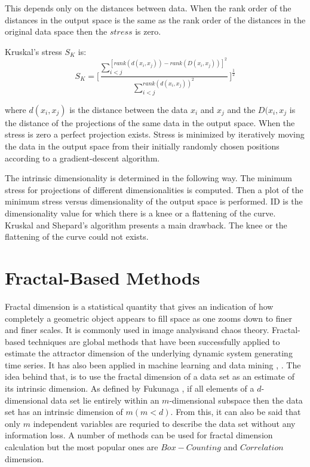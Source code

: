 \documentclass[journal]{IEEEtran}
\begin{document}
This depends only on the distances between data. When the rank order of the distances in the 
output space is the same as the rank order of the distances in the original data space then the \(stress\) is zero.

Kruskal’s stress \(S_K\) is:
\begin{equation}
  \label{eq_stress_sk}
  S_K =  \Big[\frac{\sum_{i<j}^{[rank(d(x_i, x_j)) - rank(D(x_i, x_j))]^2}}{\sum_{i<j}^{rank(d(x_i, x_j))^2}}\Big]^{\frac{1}{2}}
\end{equation}
  
where \(d(x_i, x_j)\) is the distance between the data \(x_i\) and \(x_j\) and the \(D(x_i, x_j\) is 
the distance of the projections of the same data in the output space. When the stress is zero a perfect projection exists. 
Stress is minimized by iteratively moving the data in the output space from their initially randomly chosen positions 
according to a gradient-descent algorithm.

The intrinsic dimensionality is determined in the following way. The minimum stress for projections of different dimensionalities is computed. 
Then a plot of the minimum stress versus dimensionality of the output space is performed. 
ID is the dimensionality value for which there is a knee or a flattening of the curve. 
Kruskal and Shepard’s algorithm presents a main drawback. The knee or the flattening of the curve could not exists.


\section{Fractal-Based Methods}
Fractal dimension is a statistical quantity that gives an indication of how completely a 
geometric object appears to fill space as one zooms down to finer and finer scales.
It is commonly used in image analysisand chaos theory.
Fractal-based techniques are global methods that have been successfully applied to estimate 
the attractor dimension of the underlying dynamic system generating time series.
It has also been applied in machine learning and data mining \cite{Bhavani08}, \cite{CamastraOct2002}. The idea behind that, is to use the fractal dimension of a data set 
as an estimate of its intrinsic dimension. As defined by Fukunaga \cite{Fukunaga82}, if all elements of a 
\(d\)-dimensional data set lie entirely within an \(m\)-dimensional subspace then the data set has an intrinsic dimension of \(m (m < d)\).
From this, it can also be said that only \(m\) independent variables are requried to describe the data set without any information loss.
A number of methods can be used for fractal dimension calculation but the most popular ones are \(Box-Counting\) and \(Correlation\) dimension.
\end{document}
